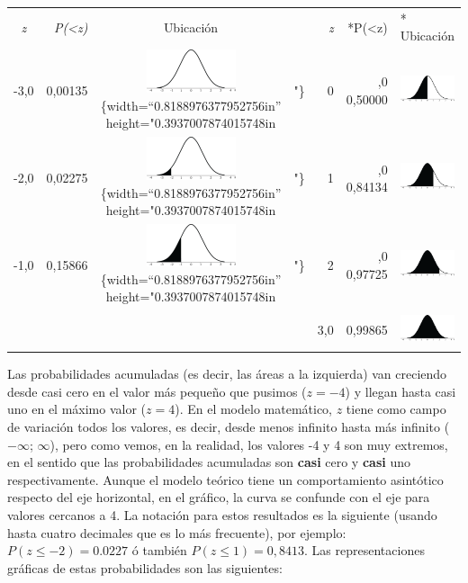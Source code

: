 \documentclass[]{book}
\begin{document}
\begin{longtable}[]{@{}crclrrl@{}}
\toprule
\endhead
\emph{z} & \emph{P(\textless{}z)} & Ubicación & & \emph{z} & *P(\textless{}z) & * Ubicación\tabularnewline
-3,0 & 0,00135 & \includegraphics{imagenes/image111.png}\{width=``0.8188976377952756in'' height="0.3937007874015748in & "\} & 0 & ,0 0,50000 & \includegraphics[width=0.8189in,height=0.3937in]{imagenes/image112.png}\tabularnewline
-2,0 & 0,02275 & \includegraphics{imagenes/image113.png}\{width=``0.8188976377952756in'' height="0.3937007874015748in & "\} & 1 & ,0 0,84134 & \includegraphics[width=0.8189in,height=0.3937in]{imagenes/image114.png}\tabularnewline
-1,0 & 0,15866 & \includegraphics{imagenes/image115.png}\{width=``0.8188976377952756in'' height="0.3937007874015748in & "\} & 2 & ,0 0,97725 & \includegraphics[width=0.8189in,height=0.3937in]{imagenes/image116.png}\tabularnewline
& & & & 3,0 & 0,99865 & \includegraphics[width=0.8189in,height=0.3937in]{imagenes/image117.png}\tabularnewline
\bottomrule
\end{longtable}

Las probabilidades acumuladas (es decir, las áreas a la izquierda) van
creciendo desde casi cero en el valor más pequeño que pusimos (\(z = -4\)) y
llegan hasta casi uno en el máximo valor (\(z = 4\)). En el modelo
matemático, \(z\) tiene como campo de variación todos los valores, es decir,
desde menos infinito hasta más infinito (\(-\infty\); \(\infty\)), pero como vemos,
en la realidad, los valores -4 y 4 son muy extremos, en el sentido que
las probabilidades acumuladas son \textbf{casi} cero y \textbf{casi} uno
respectivamente. Aunque el modelo teórico tiene un comportamiento
asintótico respecto del eje horizontal, en el gráfico, la curva se
confunde con el eje para valores cercanos a 4. La notación para estos
resultados es la siguiente (usando hasta cuatro decimales que es lo más
frecuente), por ejemplo: \(P(z\leq-2)= 0.0227\) ó también \(P(z\leq1) = 0,8413\). Las representaciones gráficas de estas probabilidades son las
siguientes:
\end{document}
